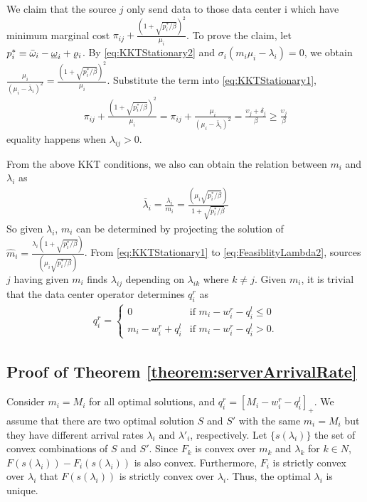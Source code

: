We claim that the source $j$ only send data to those data center i which have minimum marginal cost $\pi_{ij} + \frac{(1+\sqrt{p^*_i/\beta})^2}{\mu_i}$. To prove the claim, let $p^*_i = \bar{\omega}_i - \underbar{$\omega$}_i + \varrho_i$. By \eqref{eq:KKTStationary2} and $\sigma_i(m_i\mu_i-\lambda_i) = 0$, we obtain $\frac{\mu_i}{(\mu_i-\bar{\lambda}_i)^2} = \frac{(1+\sqrt{p^*_i / \beta})^2}{\mu_i}$. Substitute the term into \eqref{eq:KKTStationary1},
\begin{eqnarray}
\label{eq:marginalCost}
\pi_{ij} + \frac{(1+\sqrt{p^*_i/\beta})^2}{\mu_i} = \pi_{ij} + \frac{\mu_i}{(\mu_i-\bar{\lambda}_i)^2} = \frac{\upsilon_j+\delta_j}{\beta} \geq \frac{\upsilon_j}{\beta}
\end{eqnarray}
equality happens when $\lambda_{ij} > 0$.

From the above KKT conditions, we also can obtain the relation between $m_i$ and $\lambda_i$ as
\begin{eqnarray}
\label{eq:ServerArrivalRate}
\bar{\lambda}_i = \frac{\lambda_i}{m_i} = \frac{(\mu_i\sqrt{p^*_i/\beta})}{1+\sqrt{p^*_i/\beta}}
\end{eqnarray}
So given $\lambda_i$, $m_i$ can be determined by projecting the solution of $\hat{m}_i = \frac{\lambda_i(1+\sqrt{p^*_i/\beta})}{(\mu_i\sqrt{p^*_i/\beta})}$. From \eqref{eq:KKTStationary1} to \eqref{eq:FeasiblityLambda2}, sources $j$ having given $m_i$ finds $\lambda_{ij}$ depending on $\lambda_{ik}$ where $k \neq j$. Given $m_i$, it is trivial that the data center operator determines $q^r_i$ as
\begin{eqnarray}
q^r_i =  
\begin{cases} 
0  &\mbox{if  } m_i-w^r_i-q^l_i \leq 0 \\ 
m_i-w^r_i+q^l_i & \mbox{if  } m_i-w^r_i-q^l_i > 0. 
\end{cases}
\end{eqnarray}

\subsection{Proof of Theorem \ref{theorem:serverArrivalRate}}
\label{proof:serverArrivalRate}

Consider $m_i = M_i$ for all optimal solutions, and $q^r_i = [M_i-w^r_i-q^l_i]_+$. We assume that there are two optimal solution $S$ and $S'$ with the same $m_i=M_i$ but they have different arrival rates $\lambda_i$ and $\lambda '_i$, respectively. Let $\{s(\lambda_i)\}$ the set of convex combinations of $S$ and $S'$. Since $F_k$ is convex over $m_k$ and $\lambda_k$ for $k \in N$, $F(s(\lambda_i))-F_i(s(\lambda_i))$ is also convex. Furthermore, $F_i$ is strictly convex over $\lambda_i$ that $F(s(\lambda_i))$ is strictly convex over $\lambda_i$. Thus, the optimal $\lambda_i$ is unique.

